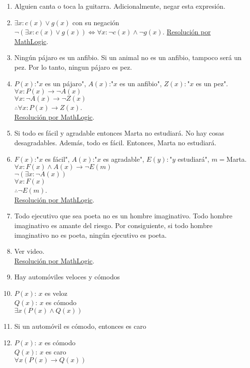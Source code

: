 \documentclass[a4paper]{article}
\newcommand{\answer}{\item[**]}
\newcommand{\then}{\to}
\newcommand{\Eq}{\Leftrightarrow}
\begin{document}
\begin{enumerate}
\begin{enumerate} [label=(\alph*)]
		\item Alguien canta o toca la guitarra. Adicionalmente, negar esta expresión. 
		\answer $\exists x: c(x) \lor g (x)$ con su negación $\neg \left(\exists x: c(x) \lor g (x)\right) \Eq \forall x: \neg c(x) \land \neg g(x)$. \href{https://youtu.be/rnaCiSpVtP4}{Resolución por MathLogic}.

		\item Ningún pájaro es un anfibio. Si un animal no es un anfibio, tampoco será un pez. Por lo tanto, ningun pájaro es pez.
		\answer $P(x)$:"$x$ es un pájaro", $A(x)$:"$x$ es un anfibio", $Z(x):$"$x$ es un pez".\\ $\forall x: P(x) \then \neg A(x)$ \\ $\forall x: \neg A(x) \then \neg Z(x)$ \\ $\therefore \forall x: P(x) \then Z(x)$. \\\href{https://youtu.be/M71MEB3TkVw?t=32}{Resolución por MathLogic}.

		\item Si todo es fácil y agradable entonces Marta no estudiará. No hay cosas desagradables. Además, todo es fácil. Entonces, Marta no estudiará.
		\answer $F(x)$:"$x$ es fácil", $A(x)$:"$x$ es agradable", $E(y):$"$y$ estudiará", $m=$Marta.\\ $\forall x: F(x) \land A(x) \then \neg E(m)$ \\ $\neg \left( \exists x: \neg A(x) \right)$ \\ $\forall x: F(x)$ \\ $\therefore \neg E(m)$. \\\href{https://youtu.be/M71MEB3TkVw?t=736}{Resolución por MathLogic}.

		\item Todo ejecutivo que sea poeta no es un hombre imaginativo. Todo hombre imaginativo es amante del riesgo. Por consiguiente, si todo hombre imaginativo no es poeta, ningún ejecutivo es poeta.
		\answer Ver video. \\\href{https://youtu.be/M71MEB3TkVw?t=1191}{Resolución por MathLogic}.

		\item Hay automóviles veloces y cómodos
		\answer $P(x)$: $x$ es veloz \\ $Q(x)$: $x$ es cómodo \\ $\exists x ( P(x) \land  Q(x) )$

		\item Si un automóvil es cómodo, entonces es caro
		\answer $P(x)$: $x$ es cómodo \\ $Q(x)$: $x$ es caro  \\ $\forall x ( P(x) \then  Q(x) )$


\end{enumerate}
\end{enumerate}
\end{document}
